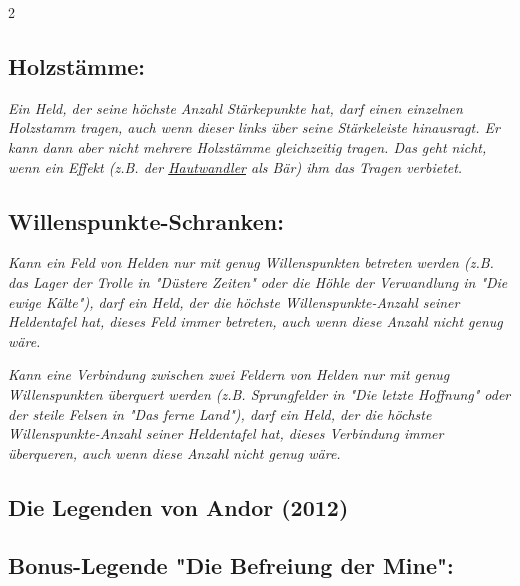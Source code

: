 \documentclass[10pt, a4paper, oneside]{book}
\newcommand{\fan}[1]{\textit{#1}}
\begin{document}
\begin{multicols*}{2}
\begin{nobgcolor}
\subsection{Holzstämme:}

\fan{Ein Held, der seine höchste Anzahl Stärkepunkte hat, darf einen einzelnen Holzstamm tragen, auch wenn dieser links über seine Stärkeleiste hinausragt. Er kann dann aber nicht mehrere Holzstämme gleichzeitig tragen. Das geht nicht, wenn ein Effekt (z.B. der \hyperref[Hautwandler]{Hautwandler} als Bär) ihm das Tragen verbietet.} 




\subsection{Willenspunkte-Schranken:}

\fan{Kann ein Feld von Helden nur mit genug Willenspunkten betreten werden (z.B. das Lager der Trolle in "Düstere Zeiten" oder die Höhle der Verwandlung in "Die ewige Kälte"), darf ein Held, der die höchste Willenspunkte-Anzahl seiner Heldentafel hat, dieses Feld immer betreten, auch wenn diese Anzahl nicht genug wäre.}

\fan{Kann eine Verbindung zwischen zwei Feldern von Helden nur mit genug Willenspunkten überquert werden (z.B. Sprungfelder in "Die letzte Hoffnung" oder der steile Felsen in "Das ferne Land"), darf ein Held, der die höchste Willenspunkte-Anzahl seiner Heldentafel hat, dieses Verbindung immer überqueren, auch wenn diese Anzahl nicht genug wäre.}









\end{nobgcolor}








\begin{bgcolor}
\section{Die Legenden von Andor (2012)}




\subsection{Bonus-Legende "Die Befreiung der Mine":}


\end{bgcolor}
\end{multicols*}
\end{document}
